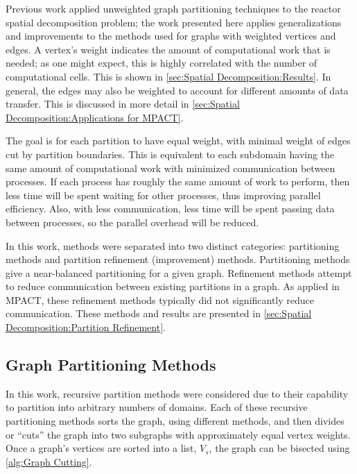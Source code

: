 {{    Previous work \cite{Fitzgerald2017} applied unweighted graph partitioning techniques to the reactor spatial decomposition problem; the work presented here applies generalizations and improvements to the methods used for graphs with weighted vertices and edges.
    A vertex's weight indicates the amount of computational work that is needed; as one might expect, this is highly correlated with the number of computational cells.
    This is shown in \cref{sec:Spatial Decomposition:Results}.
    In general, the edges may also be weighted to account for different amounts of data transfer.
    This is discussed in more detail in \cref{sec:Spatial Decomposition:Applications for MPACT}.

    The goal is for each partition to have equal weight, with minimal weight of edges cut by partition boundaries.
    This is equivalent to each subdomain having the same amount of computational work with minimized communication between processes.
    If each process has roughly the same amount of work to perform, then less time will be spent waiting for other processes, thus improving parallel efficiency.
    Also, with less communication, less time will be spent passing data between processes, so the parallel overhead will be reduced.

    In this work, methods were separated into two distinct categories: partitioning methods and partition refinement (improvement) methods.
    Partitioning methods give a near-balanced partitioning for a given graph.
    Refinement methods attempt to reduce communication between existing partitions in a graph.
    As applied in MPACT, these refinement methods typically did not significantly reduce communication.
    These methods and results are presented in \cref{sec:Spatial Decomposition:Partition Refinement}.
    \subsection{Graph Partitioning Methods}{\label{ssec:Spatial Decomposition:Graph Partitioning Methods}
      In this work, recursive partition methods were considered due to their capability to partition into arbitrary numbers of domains.
      Each of these recursive partitioning methods sorts the graph, using different methods, and then divides or ``cuts'' the graph into two subgraphs with approximately equal vertex weights.
      Once a graph's vertices are sorted into a list, $V_s$, the graph can be bisected using \cref{alg:Graph Cutting}.

}}}
